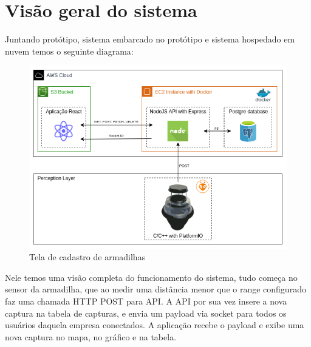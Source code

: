 \documentclass[
	12pt,				%
	openright,			%
	oneside,			%
	a4paper,			%
	chapter=TITLE,		%
	english,			%
	brazil				%
	]{abntex2}
\begin{document}
\section{Visão geral do sistema}

Juntando protótipo, sistema embarcado no protótipo e sistema hospedado em nuvem temos o seguinte diagrama:

\begin{figure}[H]
    \centering
    \includegraphics[scale=0.6]{imagens/diagramacloudarmadilha.png}
    \caption{Tela de cadastro de armadilhas}
        \label{fig:diagramacloudarmadilha}
    \end{figure}


Nele temos uma visão completa do funcionamento do sistema, tudo começa no sensor da armadilha, que ao medir uma distância menor
que o range configurado faz uma chamada HTTP POST para API. A API por sua vez insere a nova captura na tabela de capturas, e 
envia um payload via socket para todos os usuários daquela empresa conectados. A aplicação recebe o payload e exibe uma nova captura
no mapa, no gráfico e na tabela.
\end{document}
